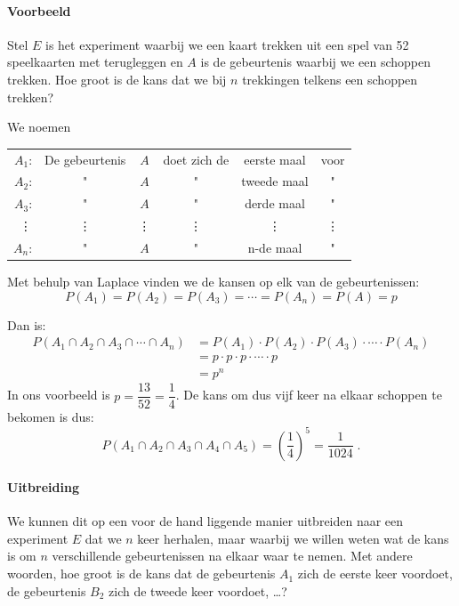 \documentclass[12pt,twoside]{article}
\begin{document}
\paragraph*{Voorbeeld}
Stel $E$ is het experiment waarbij we een kaart trekken uit een spel van 52 speelkaarten met terugleggen en $A$ is de gebeurtenis waarbij we een schoppen trekken.
Hoe groot is de kans dat we bij $n$ trekkingen telkens een schoppen trekken?

We noemen 
\begin{center}
  \renewcommand{\arraystretch}{1}
  \begin{tabular}{r@{ }c@{ }c@{ }c@{ }c@{ }c}
    $A_1$: & De gebeurtenis & $A$ & doet zich de & eerste maal & voor\\
    $A_2$: &        "       & $A$ &       "      & tweede maal &   " \\
    $A_3$: &        "       & $A$ &       "      & derde maal &   " \\
    \vdots &    \vdots      & \vdots &  \vdots   &  \vdots  &\vdots \\
    $A_n$: &        "       & $A$ &       "      & n-de maal &   " \\
  \end{tabular}
\end{center}

Met behulp van Laplace vinden we de kansen op elk van de gebeurtenissen:
$$P(A_1)=P(A_2)=P(A_3)=\cdots=P(A_n)=P(A)=p$$

Dan is:
\begin{align*}
  P(A_1\cap A_2 \cap A_3\cap \cdots \cap A_n)&=P(A_1)\cdot P(A_2)\cdot P(A_3)\cdot \cdots \cdot P(A_n)\\
                                             &=p\cdot p\cdot p\cdot \cdots \cdot p\\
                                             &= p^n
\end{align*}
In ons voorbeeld is $p=\dfrac{13}{52}=\dfrac{1}{4}$. De kans om dus vijf keer na elkaar schoppen te bekomen is dus:
$$P(A_1\cap A_2 \cap A_3\cap A_4 \cap A_5)=\left(\dfrac{1}{4}\right)^5=\dfrac{1}{1024}\;.$$

\paragraph*{Uitbreiding} We kunnen dit op een voor de hand liggende manier uitbreiden naar een experiment $E$ dat we $n$ keer herhalen, maar waarbij we willen weten wat de kans is om $n$ verschillende gebeurtenissen na elkaar waar te nemen. Met andere woorden, hoe groot is de kans dat de gebeurtenis $A_1$ zich de eerste keer voordoet, de gebeurtenis $B_2$ zich de tweede keer voordoet, \ldots?
\end{document}
